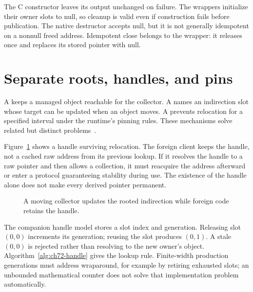 The C constructor leaves its output unchanged on failure.
The wrappers initialize their owner slots to null, so cleanup is valid even if construction fails before publication.
The native destructor accepts null, but it is not generally idempotent on a nonnull freed address.
Idempotent close belongs to the wrapper: it releases once and replaces its stored pointer with null.

\section{Separate roots, handles, and pins}
\label{sec:ch72-movement}
A  keeps a managed object reachable for the collector.
A  names an indirection slot whose target can be updated when an object moves.
A  prevents relocation for a specified interval under the runtime's pinning rules.
These mechanisms solve related but distinct problems~\cite{jones-2023-garbage}.

Figure~\ref{fig:ch72-handle} shows a handle surviving relocation.
The foreign client keeps the handle, not a cached raw address from its previous lookup.
If it resolves the handle to a raw pointer and then allows a collection, it must reacquire the address afterward or enter a protocol guaranteeing stability during use.
The existence of the handle alone does not make every derived pointer permanent.

\begin{figure}[htbp]
\centering
{}
\caption{A moving collector updates the rooted indirection while foreign code retains the handle.}
\label{fig:ch72-handle}
\end{figure}

The companion handle model stores a slot index and generation.
Releasing slot $(0,0)$ increments its generation; reusing the slot produces $(0,1)$.
A stale $(0,0)$ is rejected rather than resolving to the new owner's object.
Algorithm~\ref{alg:ch72-handle} gives the lookup rule.
Finite-width production generations must address wraparound, for example by retiring exhausted slots; an unbounded mathematical counter does not solve that implementation problem automatically.

